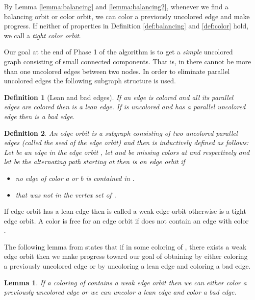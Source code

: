 \documentclass[titlepage, 11pt]{article}
\newtheorem{definition}{Definition}
\newtheorem{lemma}[theorem]{Lemma}
\begin{document}
By Lemma \ref{lemma:balancing} and \ref{lemma:balancing2}, 
whenever we find a balancing orbit or color orbit, we can color a previously 
uncolored edge and make progress.
If neither of properties in Definition \ref{def:balancing} and \ref{def:color}
hold, we call  a \emph{tight color orbit}.

\vspace{5pt}
Our goal at the end of Phase 1 of the algorithm is to get a \emph{simple} uncolored graph  consisting of small connected components.
That is, in  there cannot be more than one uncolored edges between two nodes. 
In order to eliminate parallel uncolored edges the following subgraph structure is used.

\begin{definition}[Lean and bad edges]
If an edge  is colored and all its parallel edges are colored then  is a \emph{lean} edge. 
If  is uncolored and has a parallel uncolored edge then  is a \emph{bad} edge.
\end{definition}

\begin{definition}
An \emph{edge orbit} is a subgraph consisting of two uncolored parallel edges (called the \emph{seed} of the edge orbit) and then is inductively defined as follows:
Let  be an edge in the edge orbit , let  and  be missing colors at  and  respectively and let  be the alternating path starting at  then  is an edge orbit if
\begin{itemize}
\item no edge of color a or b is contained in .
\item  that was not in the vertex set of .\\
\end{itemize}
\end{definition}
If edge orbit  has a lean edge then  is called a weak edge orbit otherwise  is a tight edge orbit. A color  is free for an edge orbit  if  does not contain an edge with color . 

The following lemma from \cite{sanders05} states that if in some coloring of , there exists a weak edge orbit then we make progress toward our goal of obtaining  by either coloring a previously uncolored edge or by uncoloring a lean edge and coloring a bad edge.
\begin{lemma}\label{lemma:weakedge}
\cite{sanders05} If a coloring of  contains a weak edge orbit then we can either color a previously uncolored edge or we can uncolor a lean edge and color a bad edge.\\
\end{lemma}
\end{document}
